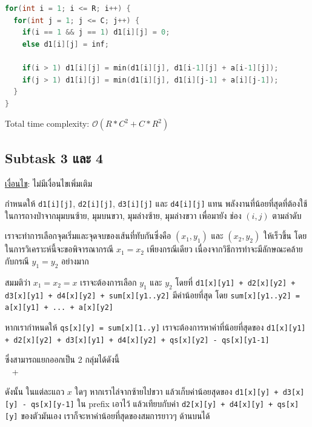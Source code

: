 \documentclass[12pt]{article}
\begin{document}
\begin{lstlisting}[language=C++, title={ตัวอย่างการคำนวณพลังงานจากช่องมุมบนซ้ายไปยังทุกช่อง},captionpos=b]
for(int i = 1; i <= R; i++) {
  for(int j = 1; j <= C; j++) {
    if(i == 1 && j == 1) d1[i][j] = 0;
    else d1[i][j] = inf;
        
    if(i > 1) d1[i][j] = min(d1[i][j], d1[i-1][j] + a[i-1][j]);
    if(j > 1) d1[i][j] = min(d1[i][j], d1[i][j-1] + a[i][j-1]);
  }
}
\end{lstlisting}

Total time complexity: $\mathcal{O}(R * C^2 + C * R^2)$

\subsection{Subtask 3 และ 4}

\underline{เงื่อนไข}: ไม่มีเงื่อนไขเพิ่มเติม

กำหนดให้ \texttt{\scriptsize{d1[i][j]}}, \texttt{\scriptsize{d2[i][j]}}, \texttt{\scriptsize{d3[i][j]}} และ \texttt{\scriptsize{d4[i][j]}} แทน พลังงานที่น้อยที่สุดที่ต้องใช้ในการถางป่าจากมุมบนซ้าย, มุมบนขวา, มุมล่างซ้าย, มุมล่างขวา เพื่อมายัง ช่อง $(i,j)$ ตามลำดับ

เราจะทำการเลือกจุดเริ่มและจุดจบของเส้นที่ทับกันซึ่งคือ $(x_1, y_1)$ และ $(x_2, y_2)$ ให้เร็วขึ้น โดยในการวิเคราะห์นี้จะขอพิจารณากรณี $x_1 = x_2$ เพียงกรณีเดียว เนื่องจากวิธีการทำจะมีลักษณะคล้ายกับกรณี $y_1 = y_2$ อย่างมาก

สมมติว่า $x_1 = x_2 = x$ เราจะต้องการเลือก $y_1$ และ $y_2$ โดยที่ \texttt{\scriptsize{d1[x][y1] + d2[x][y2] + d3[x][y1] + \newline
d4[x][y2] + sum[x][y1..y2]}} มีค่าน้อยที่สุด โดย \texttt{\scriptsize{sum[x][y1..y2] = a[x][y1] + ... + a[x][y2]}}

หากเรากำหนดให้ \texttt{\scriptsize{qs[x][y] = sum[x][1..y]}} เราจะต้องการหาค่าที่น้อยที่สุดของ \texttt{\scriptsize{d1[x][y1] + d2[x][y2] + \newline d3[x][y1] + d4[x][y2] + qs[x][y2] - qs[x][y1-1]}}

ซึ่งสามารถแยกออกเป็น 2 กลุ่มได้ดังนี้ \\\
{\setlength{\fboxsep}{2pt}} + {\setlength{\fboxsep}{2pt}}

ดังนั้น ในแต่ละแถว $x$ ใดๆ หากเราไล่จากซ้ายไปขวา แล้วเก็บค่าน้อยสุดของ \texttt{\scriptsize{d1[x][y]  + d3[x][y] - qs[x][y-1]}} ใน prefix เอาไว้ แล้วเทียบกับค่า \texttt{\scriptsize{d2[x][y] + d4[x][y] + qs[x][y]}} ของตัวมันเอง เราก็จะหาค่าน้อยที่สุดของสมการยาวๆ ด้านบนได้
\end{document}
